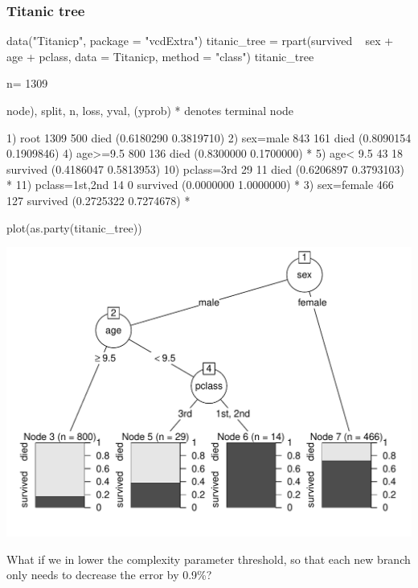 \documentclass[a4paper]{article}\usepackage[]{graphicx}\usepackage[]{xcolor}
\begin{document}
\subsubsection{Titanic tree}
\begin{Schunk}
\begin{Sinput}
data("Titanicp", package = "vcdExtra")
titanic_tree = rpart(survived ~ sex + age + pclass, data = Titanicp, method = "class")
titanic_tree
\end{Sinput}
\begin{Soutput}
n= 1309 

node), split, n, loss, yval, (yprob)
      * denotes terminal node

 1) root 1309 500 died (0.6180290 0.3819710)  
   2) sex=male 843 161 died (0.8090154 0.1909846)  
     4) age>=9.5 800 136 died (0.8300000 0.1700000) *
     5) age< 9.5 43  18 survived (0.4186047 0.5813953)  
      10) pclass=3rd 29  11 died (0.6206897 0.3793103) *
      11) pclass=1st,2nd 14   0 survived (0.0000000 1.0000000) *
   3) sex=female 466 127 survived (0.2725322 0.7274678) *
\end{Soutput}
\begin{Sinput}
plot(as.party(titanic_tree))
\end{Sinput}


{\centering \includegraphics[width=0.95\linewidth]{figure/listings-unnamed-chunk-437-1} 

}

\end{Schunk}
What if we in lower the complexity parameter threshold, so that each new branch only needs to decrease the error by 0.9\%?
\end{document}
